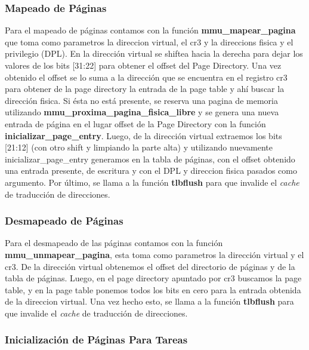 \subsubsection{Mapeado de Páginas}

Para el mapeado de páginas contamos con la función \textbf{mmu_mapear_pagina} que toma como parametros la direccion virtual, el cr3 y la direccions fisica y el privilegio (DPL). En la dirección virtual se shiftea hacia la derecha para dejar los valores de los bits [31:22] para obtener el offset del Page Directory. Una vez obtenido el offset se lo suma a la dirección que se encuentra en el registro cr3 para obtener de la page directory la entrada de la page table y ahí buscar la dirección fisica. Si ésta no está presente, se reserva una pagina de memoria utilizando \textbf{mmu_proxima_pagina_fisica_libre} y se genera una nueva entrada de página en el lugar offset de la Page Directory con la función \textbf{inicializar_page_entry}. 
Luego, de la dirección virtual extraemos los bits [21:12] (con otro shift y limpiando la parte alta) y utilizando nuevamente inicializar_page_entry generamos en la tabla de páginas, con el offset obtenido una entrada presente, de escritura y con el DPL y direccion fisica pasados como argumento. Por último, se llama a la función \textbf{tlbflush} para que invalide el \textit{cache} de traducción de direcciones.

\subsubsection{Desmapeado de Páginas}

Para el desmapeado de las páginas contamos con la función \textbf{mmu_unmapear_pagina}, esta toma como parametros la dirección virtual y el cr3. De la dirección virtual obtenemos el offset del directorio de páginas y de la tabla de páginas. Luego, en el page directory apuntado por cr3 buscamos la page table, y en la page table ponemos todos los bits en cero para la entrada obtenida de la direccion virtual. Una vez hecho esto, se llama a la función \textbf{tlbflush} para que invalide el \textit{cache} de traducción de direcciones.


\subsubsection{Inicialización de Páginas Para Tareas}

